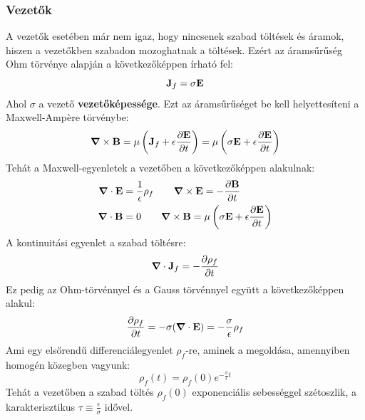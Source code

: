 \documentclass[../main.tex]{subfiles}
\begin{document}
\subsubsection*{Vezetők}
A vezetők esetében már nem igaz, hogy nincsenek szabad töltések és áramok, hiszen a vezetőkben szabadon mozoghatnak a töltések. Ezért az áramsűrűség Ohm törvénye alapján a következőképpen írható fel:
\begin{equation}
    \bold{J}_f = \sigma \bold{E}
\end{equation}
Ahol $\sigma$ a vezető \textbf{vezetőképessége}. Ezt az áramsűrűséget be kell helyettesíteni a Maxwell-Ampère törvénybe:
\begin{equation}
    \boldsymbol{\nabla} \times \bold{B} = \mu \left( \bold{J}_f + \epsilon \frac{\partial \bold{E}}{\partial t} \right) = \mu \left( \sigma \bold{E} + \epsilon \frac{\partial \bold{E}}{\partial t} \right)
\end{equation}
Tehát a Maxwell-egyenletek a vezetőben a következőképpen alakulnak:
\begin{equation}
    \begin{aligned}
        \boldsymbol{\nabla} \cdot \bold{E} &= \frac{1}{\epsilon} \rho_f \qquad \boldsymbol{\nabla} \times \bold{E} = -\frac{\partial \bold{B}}{\partial t} \\
        \boldsymbol{\nabla} \cdot \bold{B} &= 0 \qquad \boldsymbol{\nabla} \times \bold{B} = \mu \left( \sigma \bold{E} + \epsilon \frac{\partial \bold{E}}{\partial t} \right)
    \end{aligned}
\end{equation}
A kontinuitási egyenlet a szabad töltésre:
\begin{equation}
    \boldsymbol{\nabla} \cdot \bold{J}_f = - \frac{\partial \rho_f}{\partial t}
\end{equation}
Ez pedig az Ohm-törvénnyel és a Gauss törvénnyel együtt a következőképpen alakul:
\begin{equation}
    \frac{\partial \rho_f}{\partial t} = -\sigma (\boldsymbol{\nabla} \cdot \bold{E}) = - \frac{\sigma}{\epsilon} \rho_f
\end{equation}
Ami egy elsőrendű differenciálegyenlet $\rho_f$-re, aminek a megoldása, amennyiben homogén közegben vagyunk:
\begin{equation}
    \rho_f(t) = \rho_f(0) e^{-\frac{\sigma}{\epsilon} t}
\end{equation}
Tehát a vezetőben a szabad töltés $\rho_f(0)$ exponenciális sebességgel szétoszlik, a karakterisztikus $\tau \equiv \frac{\epsilon}{\sigma}$ idővel.
\end{document}
